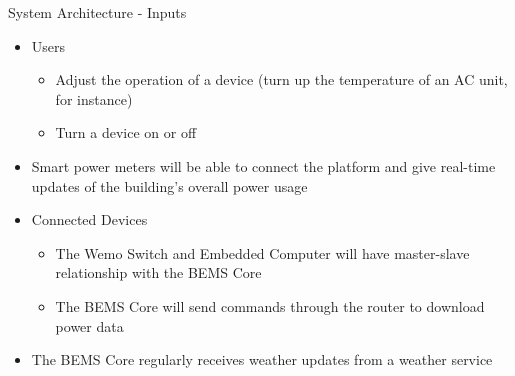 \documentclass{beamer}
\begin{document}
\begin{frame}{System Architecture - Inputs}{}
    \begin{itemize}
        \item Users
            \begin{itemize}
                \item Adjust the operation of a device (turn up the temperature of an AC unit, for instance)
                \item Turn a device on or off
            \end{itemize}
        \item Smart power meters will be able to connect the platform and give real-time updates of the building's overall power usage
        \item Connected Devices
            \begin{itemize}
                \item The Wemo Switch and Embedded Computer will have master-slave relationship with the BEMS Core
                \item The BEMS Core will send commands through the router to download power data
            \end{itemize}
        \item The BEMS Core regularly receives weather updates from a weather service
    \end{itemize}
\end{frame}
\end{document}
